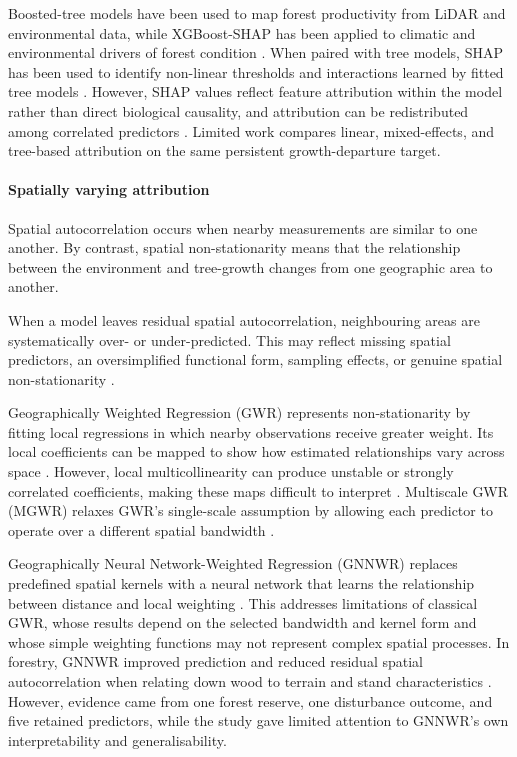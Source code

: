 \documentclass[logo,msc,ai]{infthesis}           %
\begin{document}
Boosted-tree models have been used to map forest productivity from LiDAR and environmental data, while XGBoost-SHAP has been applied to climatic and environmental drivers of forest condition \cite{puliti2023Tree_C2_CR, chen2016XGBoost_C4_NN}. When paired with tree models, SHAP has been used to identify non-linear thresholds and interactions learned by fitted tree models \cite{lundberg2017Unified_C7_XAI}. However, SHAP values reflect feature attribution within the model rather than direct biological causality, and attribution can be redistributed among correlated predictors \cite{aas2021Explaining_C7_XAI}. Limited work compares linear, mixed-effects, and tree-based attribution on the same persistent growth-departure target.

\paragraph*{Spatially varying attribution}
Spatial autocorrelation occurs when nearby measurements are similar to one another. By contrast, spatial non-stationarity means that the relationship between the environment and tree-growth changes from one geographic area to another. 

When a model leaves residual spatial autocorrelation, neighbouring areas are systematically over- or under-predicted. This may reflect missing spatial predictors, an oversimplified functional form, sampling effects, or genuine spatial non-stationarity \cite{gaspard2019Residual_C6_GWR}.

Geographically Weighted Regression (GWR) represents non-stationarity by fitting local regressions in which nearby observations receive greater weight. Its local coefficients can be mapped to show how estimated relationships vary across space \cite{brunsdon1996Geographically_C6_GWR}. However, local multicollinearity can produce unstable or strongly correlated coefficients, making these maps difficult to interpret \cite{wheeler2005Multicollinearity_C6_GWR}. Multiscale GWR (MGWR) relaxes GWR's single-scale assumption by allowing each predictor to operate over a different spatial bandwidth \cite{fotheringham2017Multiscale_C6_GWR}.

Geographically Neural Network-Weighted Regression (GNNWR) replaces predefined spatial kernels with a neural network that learns the relationship between distance and local weighting \cite{du2020Geographically_C6_GWR}. This addresses limitations of classical GWR, whose results depend on the selected bandwidth and kernel form and whose simple weighting functions may not represent complex spatial processes. In forestry, GNNWR improved prediction and reduced residual spatial autocorrelation when relating down wood to terrain and stand characteristics \cite{sun2022Local_C6_GWR}. However, evidence came from one forest reserve, one disturbance outcome, and five retained predictors, while the study gave limited attention to GNNWR's own interpretability and generalisability.
\end{document}
